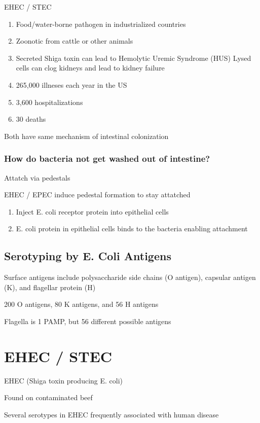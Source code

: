 \documentclass{notes}
\begin{document}
EHEC / STEC
\begin{enumerate}
    \item Food/water-borne pathogen in industrialized countries
    \item Zoonotic from cattle or other animals
    \item Secreted Shiga toxin can lead to Hemolytic Uremic Syndrome (HUS)
    \subitem Lysed cells can clog kidneys and lead to kidney failure
    \item 265,000 illneses each year in the US
    \item 3,600 hospitalizations
    \item 30 deaths
\end{enumerate}

Both have same mechanism of intestinal colonization

\subsubsection*{How do bacteria not get washed out of intestine?}
Attatch via pedestals

EHEC / EPEC induce pedestal formation to stay attatched

\begin{enumerate}
    \item Inject E. coli receptor protein into epithelial cells
    \item E. coli protein in epithelial cells binds to the bacteria enabling attachment
\end{enumerate}

\subsection*{Serotyping by E. Coli Antigens}
Surface antigens include polysaccharide side chains (O antigen), capsular antigen (K), and flagellar protein (H)

200 O antigens, 80 K antigens, and 56 H antigens

\tab \indicates Flagella is 1 PAMP, but 56 different possible antigens

\section*{EHEC / STEC}
EHEC (Shiga toxin producing E. coli)

Found on contaminated beef

Several serotypes in EHEC frequently associated with human disease
\end{document}
